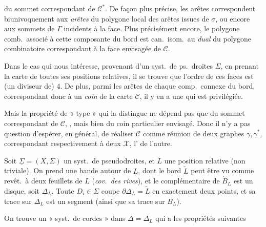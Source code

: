 \documentclass[11pt,a4paper]{article}
\begin{document}
du sommet correspondant de $\mathcal{C}^{*}$. De façon plus précise, les arêtes correspondent biunivoquement aux \emph{arêtes} du polygone local des arêtes \struck{\ill{}} issues de $\sigma$, ou encore aux sommets de $\Gamma$ incidents à la face. Plus précisément encore, le polygone comb.\ associé à cette \struck{\ill{}} composante du bord est can.\ isom.\ au \emph{dual} du polygone combinatoire correspondant à la face envisagée de $\mathcal{C}$.

Dans le cas qui nous intéresse, provenant d'un syst.\ de ps.\ droites $\Sigma$, en prenant la carte  de toutes ses positions relatives, il se trouve que l'ordre de  ces faces est (un diviseur de) $4$. De plus, parmi les  arêtes de chaque comp.\ connexe du bord, correspondant donc à un \emph{coin} de la carte $\mathcal{C}$, il y en a une qui est privilégiée.

Mais la propriété de « type » qui la distingue ne dépend pas  que du sommet correspondant de $\mathcal{C}$, , mais bien du coin  particulier envisagé. Donc il n'y a pas question d'espérer, en général, de réaliser  $\mathcal{C}$ comme réunion de deux  graphes $\gamma, \gamma^{*}$, correspondant respectivement à deux    $\mathcal{X}$,  l' de l'autre.

Soit $\underline{\Sigma} = (X, \Sigma)$ un syst.\ de pseudodroites, et $L$ une position relative (non triviale). On prend une   bande  autour de $L$, dont le bord $\widetilde{L}$ peut être vu comme revêt.\ à deux feuillets de $L$ (\emph{cov.\ des rives}), et le complémentaire de $\mathring{B}_L$ est un disque, \struck{\ill{}} soit $\Delta_L$. Toute $D_i \in \Sigma$ coupe $\partial \Delta_L = \widetilde{L}$ en exactement deux points, et sa trace \struck{\ill{}} sur $\Delta_L$ est un segment (ainsi que sa trace sur $B_L$).

On trouve un « syst.\ de cordes »  dans $\Delta = \Delta_L$ qui a les propriétés suivantes
\end{document}
